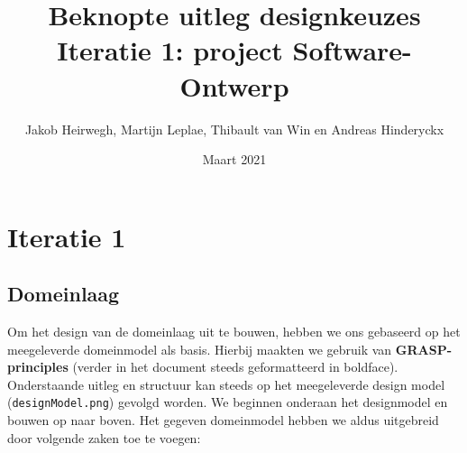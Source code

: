 \documentclass[12pt]{article}
\title{Beknopte uitleg designkeuzes\\ Iteratie 1: project Software-Ontwerp}
\author{Jakob Heirwegh, Martijn Leplae, Thibault van Win en Andreas Hinderyckx}
\date{Maart 2021}
\begin{document}
\maketitle

\newpage
\section{Iteratie 1}\label{sec:Iteratie1}
\subsection{Domeinlaag}
Om het design van de domeinlaag uit te bouwen, hebben we ons gebaseerd op het meegeleverde domeinmodel als basis. Hierbij maakten we gebruik van \textbf{GRASP-principles} (verder in het document steeds geformatteerd in boldface). Onderstaande uitleg en structuur kan steeds op het meegeleverde design model (\texttt{designModel.png}) gevolgd worden. We beginnen onderaan het designmodel en bouwen op naar boven. Het gegeven domeinmodel hebben we aldus uitgebreid door volgende zaken toe te voegen:
\end{document}
